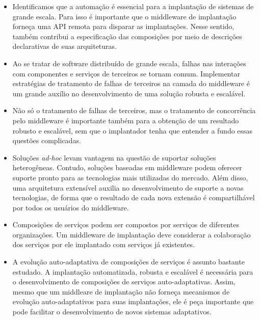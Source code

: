 \begin{itemize}

\item Identificamos que a automação é essencial
para a implantação de sistemas de grande escala.
Para isso é importante que o middleware de implantação
forneça uma API remota para disparar as implantações.
Nesse sentido, também contribui a especificação das
composições por meio de descrições declarativas de
suas arquiteturas.

\item Ao se tratar de software distribuído de grande escala,
falhas nas interações com componentes e serviços de terceiros
se tornam comum. Implementar estratégias de tratamento
de falhas de terceiros na camada do middleware é um
grande auxílio no desenvolvimento de uma solução robusta 
e escalável.

\item Não só o tratamento de falhas de terceiros,
mas o tratamento de concorrência pelo middleware é importante também
para a obtenção de um resultado robusto e escalável,
sem que o implantador tenha que entender a fundo essas
questões complicadas.

\item Soluções \emph{ad-hoc} levam vantagem na questão de suportar soluções heterogêneas.
Contudo, soluções baseadas em middleware podem oferecer
suporte pronto para as tecnologias mais utilizadas do mercado.
Além disso, uma arquitetura extensível auxilia no desenvolvimento
de suporte a novas tecnologias, de forma que o resultado
de cada nova extensão é compartilhável por todos os usuários do middleware.

\item Composições de serviços podem ser compostos por serviços
de diferentes organizações. Um middleware de implantação deve considerar
a colaboração dos serviços por ele implantado com serviços já existentes.

\item A evolução auto-adaptativa de composições de serviços é assunto bastante estudado.
A implantação automatizada, robusta e escalável é necessária para o
desenvolvimento de composições de serviços auto-adaptativas.
Assim, mesmo que um middleare de implantação não forneça mecanismos
de evolução auto-adaptativos para suas implantações, ele é peça importante
que pode facilitar o desenvolvimento de novos sistemas adaptativos.

\end{itemize}

